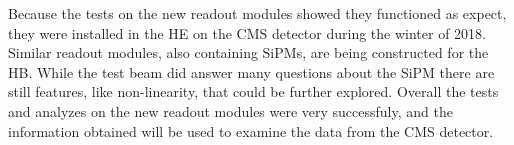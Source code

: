 Because the tests on the new readout modules showed they functioned as expect, they were installed in the HE on the CMS detector during the winter of 2018. Similar readout modules, also containing SiPMs, are being constructed for the HB. While the test beam did answer many questions about the SiPM there are still features, like non-linearity, that could be further explored. Overall the tests and analyzes on the new readout modules were very successfuly, and the information obtained will be used to examine the data from the CMS detector.

